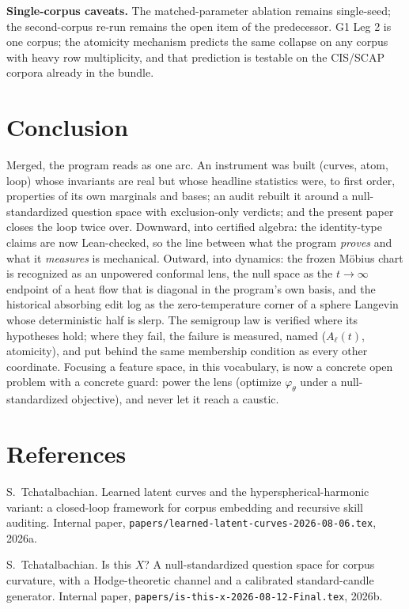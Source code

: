 \documentclass[11pt,a4paper]{article}
\theoremstyle{plain}
\theoremstyle{remark}
\begin{document}
\textbf{Single-corpus caveats.} The matched-parameter ablation remains single-seed; the second-corpus re-run remains the open item of the predecessor. G1 Leg 2 is one corpus; the atomicity mechanism predicts the same collapse on any corpus with heavy row multiplicity, and that prediction is testable on the CIS/SCAP corpora already in the bundle.

\section{Conclusion}
\label{sec:conclusion}

Merged, the program reads as one arc. An instrument was built (curves, atom, loop) whose invariants are real but whose headline statistics were, to first order, properties of its own marginals and bases; an audit rebuilt it around a null-standardized question space with exclusion-only verdicts; and the present paper closes the loop twice over. Downward, into certified algebra: the identity-type claims are now Lean-checked, so the line between what the program \emph{proves} and what it \emph{measures} is mechanical. Outward, into dynamics: the frozen M\"obius chart is recognized as an unpowered conformal lens, the null space as the $t\to\infty$ endpoint of a heat flow that is diagonal in the program's own basis, and the historical absorbing edit log as the zero-temperature corner of a sphere Langevin whose deterministic half is slerp. The semigroup law is verified where its hypotheses hold; where they fail, the failure is measured, named ($A_\ell(t)$, atomicity), and put behind the same membership condition as every other coordinate. Focusing a feature space, in this vocabulary, is now a concrete open problem with a concrete guard: power the lens (optimize $\varphi_\theta$ under a null-standardized objective), and never let it reach a caustic.

\section*{References}

\noindent S.~Tchatalbachian. Learned latent curves and the hyperspherical-harmonic variant: a closed-loop framework for corpus embedding and recursive skill auditing. Internal paper, \texttt{papers/learned-latent-curves-2026-08-06.tex}, 2026a.

\medskip\noindent S.~Tchatalbachian. Is this $X$? A null-standardized question space for corpus curvature, with a Hodge-theoretic channel and a calibrated standard-candle generator. Internal paper, \texttt{papers/is-this-x-2026-08-12-Final.tex}, 2026b.
\end{document}
